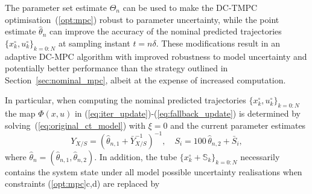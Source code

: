 \documentclass[final,5p,times,twocolumn,authoryear]{elsarticle}
\def\S{\mathbb{S}}
\begin{document}
The parameter set estimate $\Theta_n$ can be used to make the DC-TMPC optimisation~(\ref{opt:mpc}) robust to parameter uncertainty, while the point estimate $\hat{\theta}_n$ can improve the accuracy of the nominal predicted trajectories $\{x^\circ_k,u^\circ_k\}_{k=0:N}$ at sampling instant $t=n\delta$. These modifications result in an adaptive DC-MPC algorithm with improved robustness to model uncertainty and potentially better performance than the strategy outlined in Section~\ref{sec:nominal_mpc},
albeit at the expense of increased computation.

In particular, when computing the nominal predicted trajectories $\{x^\circ_k,u^\circ_k\}_{k=0:N}$ 
the map $\Phi(x,u)$ in (\ref{eq:iter_update})-(\ref{eq:fallback_update}) is determined by
solving~(\ref{eq:original_ct_model}) with $\xi=0$ and the current parameter estimates
\[
  Y_{X/S} = (\hat{\theta}_{n,1} + \bar{Y}_{X/S}^{-1})^{-1}, \quad S_i = 100\, \hat{\theta}_{n,2} + \bar{S}_i ,
\]
where $\hat{\theta}_n = (\hat{\theta}_{n,1},\hat{\theta}_{n,2})$. In addition, the tube $\{x^\circ_k + \S_k\}_{k=0:N}$ necessarily contains the system state under all model possible uncertainty realisations when constraints (\ref{opt:mpc}c,d) are replaced by%
\end{document}
